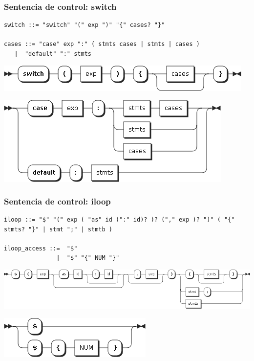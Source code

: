 \subsubsection{Sentencia de control: switch}
\begin{lstlisting}[style=nonumbers]
switch ::= "switch" "(" exp ")" "{" cases? "}"

cases ::= "case" exp ":" ( stmts cases | stmts | cases )
   |  "default" ":" stmts
\end{lstlisting}  	
\begin{center}
\includegraphics[scale=0.4]{diagram/switch.png} \\
\end{center}
\begin{center}
\includegraphics[scale=0.4]{diagram/cases.png} \\
\end{center}

\subsubsection{Sentencia de control: iloop}
\begin{lstlisting}[style=nonumbers,basicstyle=\tiny]
iloop ::= "$" "(" exp ( "as" id (":" id)? )? ("," exp )? ")" ( "{" stmts? "}" | stmt ";" | stmtb )

iloop_access ::=  "$"
               |  "$" "{" NUM "}"
\end{lstlisting}  	
\begin{center}
\includegraphics[scale=0.4]{diagram/iloop.png} \\
\end{center}
\begin{center}
\includegraphics[scale=0.4]{diagram/iloop_access.png} \\
\end{center}

